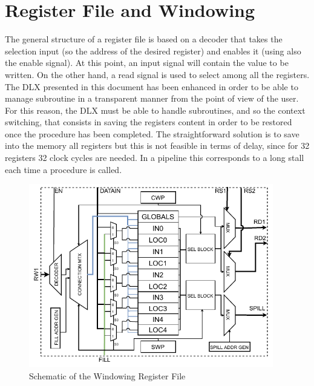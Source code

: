 \section{Register File and Windowing}
The general structure of a register file is based on a decoder that takes the selection input (so the address of the desired register) and enables it (using also the enable signal). At this point, an input signal will contain the value to be written. On the other hand, a read signal is used to select among all the registers.\newline\newline
The DLX presented in this document has been enhanced in order to be able to manage subroutine in a transparent manner from the point of view of the user. For this reason, the DLX must be able to handle subroutines, and so the context switching, that consists in saving the
registers content in order to be restored once the procedure has been completed. The straightforward solution is to save into the memory all registers but this is not feasible in terms of delay, since for 32 registers 32 clock cycles are needed. In a pipeline this corresponds to a long stall each time a procedure is called.


\begin{figure}[ht]
    \centering
    \includegraphics[width=0.95\textwidth]{chapters/4_DecodeStage/images/DLX_RF.pdf}
    \caption{Schematic of the Windowing Register File}
    \label{WRF}
\end{figure}


